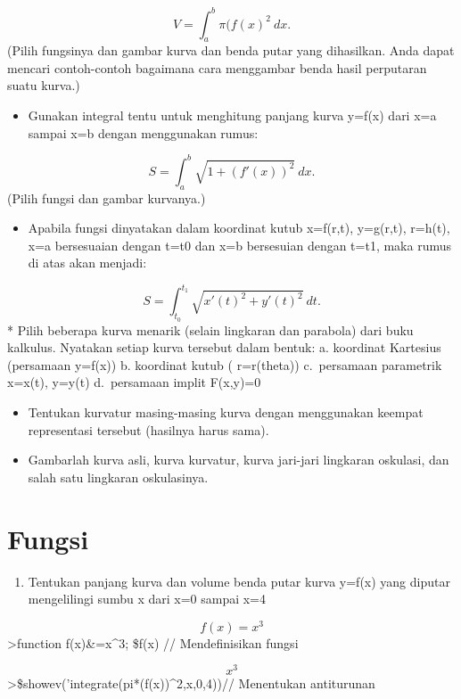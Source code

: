 \documentclass[
]{book}
\providecommand{\tightlist}{%
  \setlength{\itemsep}{0pt}\setlength{\parskip}{0pt}}
\begin{document}
\[V = \int_a^b \pi (f(x)^2\ dx.\](Pilih fungsinya dan gambar kurva dan benda putar yang dihasilkan. Anda dapat mencari contoh-contoh bagaimana cara menggambar benda hasil perputaran suatu kurva.)

\begin{itemize}
\tightlist
\item
  Gunakan integral tentu untuk menghitung panjang kurva y=f(x) dari x=a sampai x=b dengan menggunakan rumus:
\end{itemize}

\[S = \int_a^b \sqrt{1+(f'(x))^2} \ dx.\](Pilih fungsi dan gambar kurvanya.)

\begin{itemize}
\tightlist
\item
  Apabila fungsi dinyatakan dalam koordinat kutub x=f(r,t), y=g(r,t), r=h(t), x=a bersesuaian dengan t=t0 dan x=b bersesuian dengan t=t1, maka rumus di atas akan menjadi:
\end{itemize}

\[S=\int_{t_0}^{t_1} \sqrt{x'(t)^2+y'(t)^2}\ dt.\]* Pilih beberapa kurva menarik (selain lingkaran dan parabola) dari buku kalkulus. Nyatakan setiap kurva tersebut dalam bentuk: a. koordinat Kartesius (persamaan y=f(x)) b. koordinat kutub ( r=r(theta)) c.~persamaan parametrik x=x(t), y=y(t) d.~persamaan implit F(x,y)=0

\begin{itemize}
\item
  Tentukan kurvatur masing-masing kurva dengan menggunakan keempat representasi tersebut (hasilnya harus sama).
\item
  Gambarlah kurva asli, kurva kurvatur, kurva jari-jari lingkaran oskulasi, dan salah satu lingkaran oskulasinya.
\end{itemize}

\section{Fungsi}\label{fungsi}

\begin{enumerate}
\def\labelenumi{\arabic{enumi}.}
\tightlist
\item
  Tentukan panjang kurva dan volume benda putar kurva y=f(x) yang diputar mengelilingi sumbu x dari x=0 sampai x=4
\end{enumerate}

\[f(x) = x^3\]\textgreater function f(x)\&=x\^{}3; \$f(x) // Mendefinisikan fungsi

\[x^3\]\textgreater\$showev('integrate(pi*(f(x))\^{}2,x,0,4))// Menentukan antiturunan
\end{document}
